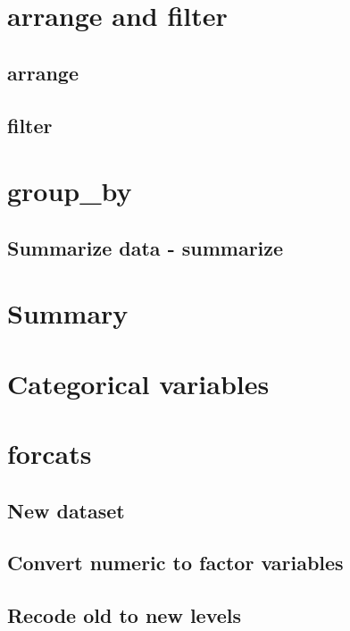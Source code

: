 \documentclass[]{book}
\theoremstyle{definition}
\theoremstyle{definition}
\theoremstyle{definition}
\theoremstyle{remark}
\begin{document}
\section{arrange and filter}\label{arrange-and-filter}

\subsection{arrange}\label{arrange}

\subsection{filter}\label{filter}

\section{group\_by}\label{group_by}

\subsection{Summarize data -
summarize}\label{summarize-data---summarize}

\section{Summary}\label{summary-4}

\section{Categorical variables}\label{categorical-variables}

\section{forcats}\label{forcats}

\subsection{New dataset}\label{new-dataset}

\subsection{Convert numeric to factor
variables}\label{convert-numeric-to-factor-variables}

\subsection{Recode old to new levels}\label{recode-old-to-new-levels}
\end{document}
